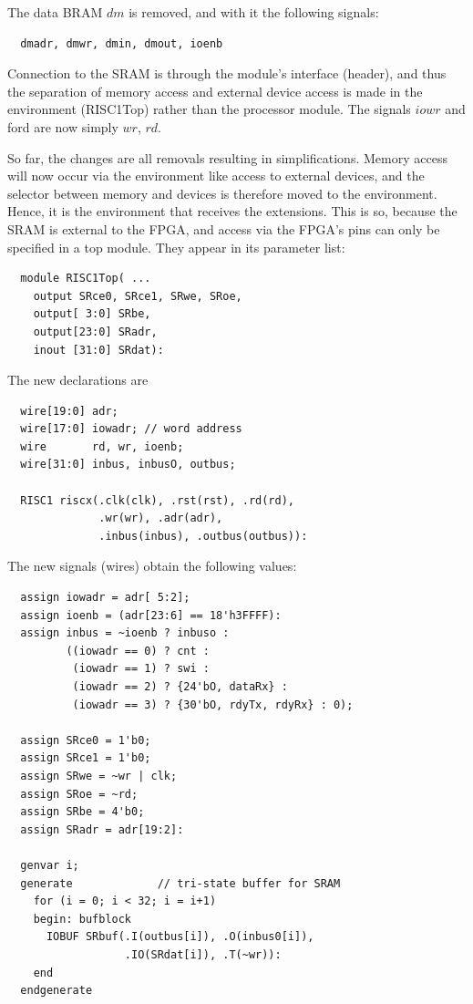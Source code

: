 The data BRAM $dm$ is removed, and with it the following signals:
\begin{verbatim}
  dmadr, dmwr, dmin, dmout, ioenb
\end{verbatim}

Connection to the SRAM is through the module’s interface (header), and thus the separation of
memory access and external device access is made in the environment (RISC1Top) rather than the
processor module. The signals $iowr$ and ford are now simply $wr$, $rd$.

So far, the changes are all removals resulting in simplifications. Memory access will now occur via
the environment like access to external devices, and the selector between memory and devices is
therefore moved to the environment. Hence, it is the environment that receives the extensions. This
is so, because the SRAM is external to the FPGA, and access via the FPGA’s pins can only be
specified in a top module. They appear in its parameter list:
\begin{verbatim}
  module RISC1Top( ...
    output SRce0, SRce1, SRwe, SRoe,
    output[ 3:0] SRbe,
    output[23:0] SRadr,
    inout [31:0] SRdat):
\end{verbatim}

The new declarations are
\begin{verbatim}
  wire[19:0] adr;
  wire[17:0] iowadr; // word address
  wire       rd, wr, ioenb;
  wire[31:0] inbus, inbusO, outbus;

  RISC1 riscx(.clk(clk), .rst(rst), .rd(rd),
              .wr(wr), .adr(adr),
              .inbus(inbus), .outbus(outbus)):
\end{verbatim}

The new signals (wires) obtain the following values:
\begin{verbatim}
  assign iowadr = adr[ 5:2];
  assign ioenb = (adr[23:6] == 18'h3FFFF):
  assign inbus = ~ioenb ? inbuso :
         ((iowadr == 0) ? cnt :
          (iowadr == 1) ? swi :
          (iowadr == 2) ? {24'bO, dataRx} :
          (iowadr == 3) ? {30'bO, rdyTx, rdyRx} : 0);
 
  assign SRce0 = 1'b0;
  assign SRce1 = 1'b0;
  assign SRwe = ~wr | clk;
  assign SRoe = ~rd;
  assign SRbe = 4'b0;
  assign SRadr = adr[19:2]:
 
  genvar i;
  generate             // tri-state buffer for SRAM
    for (i = 0; i < 32; i = i+1)
    begin: bufblock
      IOBUF SRbuf(.I(outbus[i]), .O(inbus0[i]),
                  .IO(SRdat[i]), .T(~wr)):
    end
  endgenerate
\end{verbatim}

